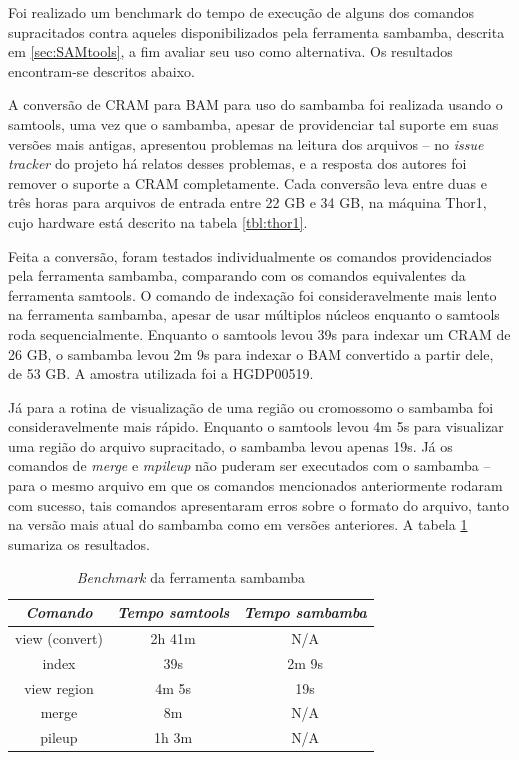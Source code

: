 \documentclass[cic,tc]{iiufrgs}
\begin{document}
Foi realizado um benchmark do tempo de execução de alguns dos comandos
supracitados contra aqueles disponibilizados pela ferramenta sambamba, descrita
em \ref{sec:SAMtools}, a fim avaliar seu uso como alternativa. Os resultados
encontram-se descritos abaixo.

A conversão de CRAM para BAM para uso do sambamba foi realizada usando o
samtools, uma vez que o sambamba, apesar de providenciar tal suporte em suas
versões mais antigas, apresentou problemas na leitura dos arquivos -- no
\textit{issue tracker} do projeto há relatos desses problemas, e a resposta dos
autores foi remover o suporte a CRAM completamente. Cada conversão leva entre
duas e três horas para arquivos de entrada entre 22 GB e 34 GB, na máquina
Thor1, cujo hardware está descrito na tabela \ref{tbl:thor1}.

Feita a conversão, foram testados individualmente os comandos providenciados
pela ferramenta sambamba, comparando com os comandos equivalentes da ferramenta
samtools. O comando de indexação foi consideravelmente mais lento na ferramenta
sambamba, apesar de usar múltiplos núcleos enquanto o samtools roda
sequencialmente. Enquanto o samtools levou 39s para indexar um CRAM de 26 GB, o
sambamba levou 2m 9s para indexar o BAM convertido a partir dele, de 53 GB. A
amostra utilizada foi a HGDP00519.

Já para a rotina de visualização de uma região ou cromossomo o sambamba foi
consideravelmente mais rápido. Enquanto o samtools levou 4m 5s para visualizar
uma região do arquivo supracitado, o sambamba levou apenas 19s. Já os comandos
de \textit{merge} e \textit{mpileup} não puderam ser executados com o sambamba
-- para o mesmo arquivo em que os comandos mencionados anteriormente rodaram
com sucesso, tais comandos apresentaram erros sobre o formato do arquivo, tanto
na versão mais atual do sambamba como em versões anteriores. A tabela
\ref{tbl:sambamba} sumariza os resultados.

\begin{table}[h]
  \caption{\textit{Benchmark} da ferramenta sambamba}
    \centering
        \begin{tabular}{c|c|c}
          \hline
          \textit{Comando}  &   \textit{Tempo samtools}  & \textit{Tempo sambamba} \\
          \hline
          \hline
          view (convert) & 2h 41m & N/A \\
          index & 39s & 2m 9s \\
          view region & 4m 5s & 19s \\
          merge & 8m & N/A \\
          pileup & 1h 3m & N/A \\
          \hline
        \end{tabular}
    \label{tbl:sambamba}
\end{table}
\end{document}
